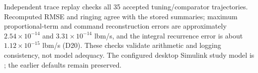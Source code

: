 Independent trace replay checks all 35 accepted tuning/comparator trajectories. Recomputed RMSE and ringing agree with the stored summaries; maximum proportional-term and command reconstruction errors are approximately $2.54\times10^{-14}$ and $3.31\times10^{-14}$ lbm/s, and the integral recurrence error is about $1.12\times10^{-15}$ lbm/s (D20). These checks validate arithmetic and logging consistency, not model adequacy. The configured desktop Simulink study model is ; the earlier defaults remain preserved.

